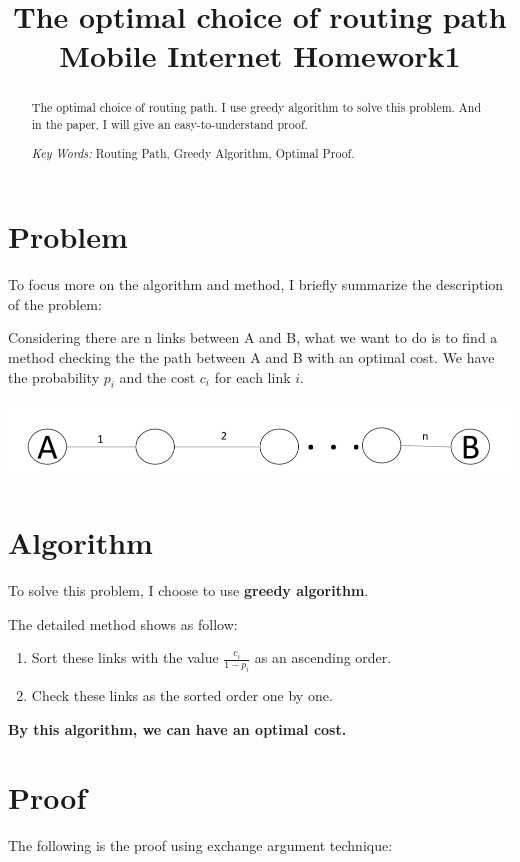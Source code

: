\documentclass{article}
\title{\textbf{The optimal choice of routing path\\Mobile Internet Homework1}}
\begin{document}
\maketitle

\begin{abstract}
The optimal choice of routing path. I use greedy algorithm to solve this problem. And in the paper, I will give an easy-to-understand proof.


\textit{Key Words: }Routing Path, Greedy Algorithm, Optimal Proof.
\end{abstract}


\section{Problem}
To focus more on the algorithm and method, I briefly summarize the description of the problem:

Considering there are n links between A and B, what we want to do is to find a method checking the the path between A and B with an optimal cost. We have the probability $p_i$ and the cost $c_i$ for each link $i$. 

\includegraphics[scale=0.45]{1.png}

\section{Algorithm}
To solve this problem, I choose to use \textbf{greedy algorithm}. 

The detailed method shows as follow:

\begin{enumerate}
    \item Sort these links with the value $\frac{c_i}{1-p_i}$ as an ascending order.
    \item Check these links as the sorted order one by one.
\end{enumerate}

\textbf{By this algorithm, we can have an optimal cost.}

\section{Proof}
The following is the proof using exchange argument technique:
\end{document}

